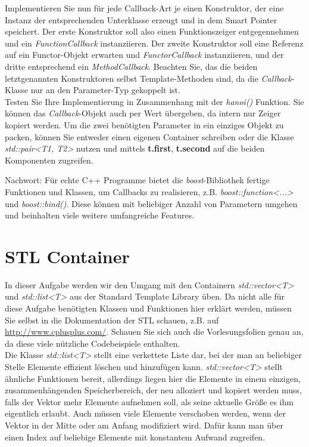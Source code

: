 \documentclass[
  accentcolor=tud1c,	%
  colorbacktitle,		%
  inverttitle,			%
  german,				%
  twoside
]{tudexercise}
\begin{document}
\begin{enumerate}
Implementieren Sie nun für jede Callback-Art je einen Konstruktor, der eine Instanz der entsprechenden Unterklasse erzeugt und in dem Smart Pointer speichert. Der erste Konstruktor soll also einen Funktionszeiger entgegennehmen und ein \emph{FunctionCallback} instanziieren. Der zweite Konstruktor soll eine Referenz auf ein Functor-Objekt erwarten und  \emph{FunctorCallback} instanziieren, und der dritte entsprechend ein \emph{MethodCallback}. Beachten Sie, das die beiden letztgenannten Konstruktoren selbst Template-Methoden sind, da die \emph{Callback}-Klasse nur an den Parameter-Typ gekoppelt ist.\\

Testen Sie Ihre Implementierung in Zusammenhang mit der \emph{hanoi()} Funktion. Sie können das \emph{Callback}-Objekt auch per Wert übergeben, da intern nur Zeiger kopiert werden. Um die zwei benötigten Parameter in ein einziges Objekt zu packen, können Sie entweder einen eigenen Container schreiben oder die Klasse \emph{std::pair<T1, T2>} nutzen und mittels \textbf{t.first}, \textbf{t.second} auf die beiden Komponenten zugreifen.
\end{enumerate}

Nachwort: Für echte C++ Programme bietet die \emph{boost}-Bibliothek fertige Funktionen und Klassen, um Callbacks zu realisieren, z.B. \emph{boost::function<...>} und \emph{boost::bind()}. Diese können mit beliebiger Anzahl von Parametern umgehen und beinhalten viele weitere umfangreiche Features.

\section{STL Container} 
In dieser Aufgabe werden wir den Umgang mit den Containern \emph{std::vector<T>} und \emph{std::list<T>} aus der Standard Template Library üben. Da nicht alle für diese Aufgabe benötigten Klassen und Funktionen hier erklärt werden, müssen Sie selbst in die Dokumentation der STL schauen, z.B. auf \href{http://www.cplusplus.com/}{http://www.cplusplus.com/}. Schauen Sie sich auch die Vorlesungsfolien genau an, da diese viele nützliche Codebeispiele enthalten. \\

Die Klasse \emph{std::list<T>} stellt eine verkettete Liste dar, bei der man an beliebiger Stelle Elemente effizient löschen und hinzufügen kann. \emph{std::vector<T>} stellt ähnliche Funktionen bereit, allerdings liegen hier die Elemente in einem einzigen, zusammenhängenden Speicherbereich, der neu alloziert und kopiert werden muss, falls der Vektor mehr Elemente aufnehmen soll, als seine aktuelle Größe es ihm eigentlich erlaubt. Auch müssen viele Elemente verschoben werden, wenn der Vektor in der Mitte oder am Anfang modifiziert wird. Dafür kann man über einen Index auf beliebige Elemente mit konstantem Aufwand zugreifen.
\end{document}
